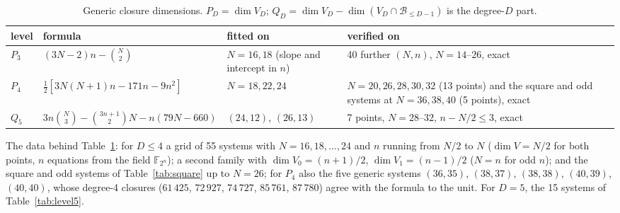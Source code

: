 \documentclass[11pt,a4paper]{article}
\theoremstyle{remark}\newtheorem{remark}{Remark}
\newcommand{\F}{\mathbb{F}}
\newcommand{\B}{\mathcal{B}}
\begin{document}
\begin{table}[ht]\centering\footnotesize
\caption{Generic closure dimensions. $P_D=\dim V_D$; $Q_D=\dim V_D-\dim(V_D\cap\B_{\le D-1})$ is the degree-$D$ part.}\label{tab:formulas}
\begin{tabular}{llp{3.6cm}p{4.6cm}}
\toprule
level & formula & fitted on & verified on\\
\midrule
$P_3$ & $(3N-2)n-\binom N2$ & $N=16,18$ (slope and intercept in $n$) & 40 further $(N,n)$, $N=14$--$26$, exact\\
$P_4$ & $\frac12[3N(N+1)n-171n-9n^2]$ & $N=18,22,24$ & $N=20,26,28,30,32$ (13 points) and the square and odd systems at $N=36,38,40$ (5 points), exact\\
$Q_5$ & $3n\binom N3-\binom{3n+1}2N-n(79N-660)$ & $(24,12)$, $(26,13)$ & 7 points, $N=28$--$32$, $n-N/2\le3$, exact\\
\bottomrule
\end{tabular}
\end{table}

The data behind Table~\ref{tab:formulas}: for $D\le4$ a grid of 55 systems with $N=16,18,\dots,24$ and $n$ running from $N/2$ to $N$ ($\dim V=N/2$ for both points, $n$ equations from the field $\F_{2^n}$); a second family with $\dim V_0=(n+1)/2$, $\dim V_1=(n-1)/2$ ($N=n$ for odd $n$); and the square and odd systems of Table~\ref{tab:square} up to $N=26$; for $P_4$ also the five generic systems $(36,35)$, $(38,37)$, $(38,38)$, $(40,39)$, $(40,40)$, whose degree-4 closures ($61\,425$, $72\,927$, $74\,727$, $85\,761$, $87\,780$) agree with the formula to the unit. For $D=5$, the 15 systems of Table~\ref{tab:level5}.
\end{document}
